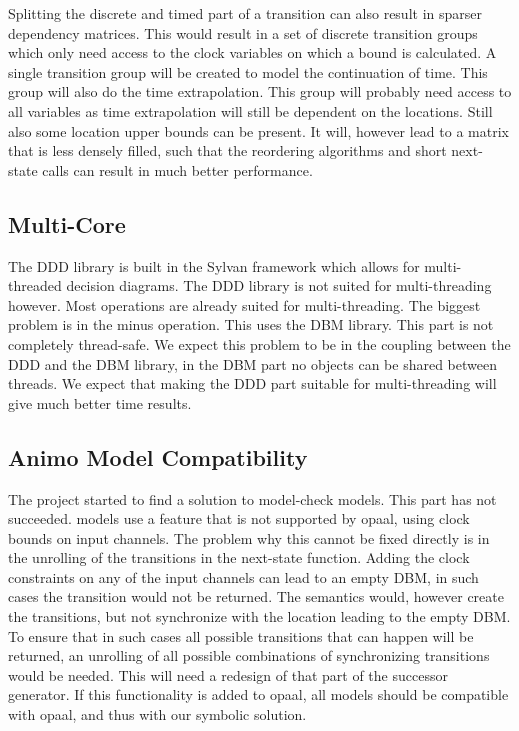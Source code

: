 Splitting the discrete and timed part of a transition can also result in sparser dependency matrices. This would result in a set of discrete transition groups which only need access to the clock variables on which a bound is calculated. A single transition group will be created to model the continuation of time. This group will also do the time extrapolation. This group will probably need access to all variables as time extrapolation will still be dependent on the locations. Still also some location upper bounds can be present. It will, however lead to a matrix that is less densely filled, such that the reordering algorithms and short next-state calls can result in much better performance.

\subsection{Multi-Core}
The DDD library is built in the Sylvan framework which allows for multi-threaded decision diagrams. The DDD library is not suited for multi-threading however. Most operations are already suited for multi-threading.  The biggest problem is in the minus operation. This uses the DBM library. This part is not completely thread-safe. We expect this problem to be in the coupling between the DDD and the DBM library, in the DBM part no objects can be shared between threads. We expect that making the DDD part suitable for multi-threading will give much better time results.

\subsection{Animo Model Compatibility}
The project started to find a solution to model-check \animo{} models. This part has not succeeded. \animo{} models use a \uppaal{} feature that is not supported by opaal, using clock bounds on input channels. The problem why this cannot be fixed directly is in the unrolling of the transitions in the next-state function. Adding the clock constraints on any of the input channels can lead to an empty DBM, in such cases the transition would not be returned. The semantics would, however create the transitions, but not synchronize with the location leading to the empty DBM. To ensure that in such cases all possible transitions that can happen will be returned, an unrolling of all possible combinations of synchronizing transitions would be needed. This will need a redesign of that part of the successor generator. If this functionality is added to opaal, all \animo{} models should be compatible with opaal, and thus with our symbolic solution.


